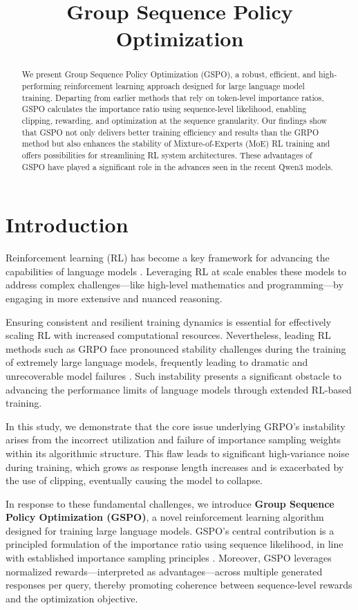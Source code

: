 \title{Group Sequence Policy Optimization}

\begin{abstract}
We present Group Sequence Policy Optimization (GSPO), a robust, efficient, and high-performing reinforcement learning approach designed for large language model training. Departing from earlier methods that rely on token-level importance ratios, GSPO calculates the importance ratio using sequence-level likelihood, enabling clipping, rewarding, and optimization at the sequence granularity. Our findings show that GSPO not only delivers better training efficiency and results than the GRPO method but also enhances the stability of Mixture-of-Experts (MoE) RL training and offers possibilities for streamlining RL system architectures. These advantages of GSPO have played a significant role in the advances seen in the recent Qwen3 models.
\end{abstract}

\section{Introduction}
\label{sec:intro}

Reinforcement learning (RL) has become a key framework for advancing the capabilities of language models \citep{o1,dpsk-r1,qwq32b,qwen3}. Leveraging RL at scale enables these models to address complex challenges—like high-level mathematics and programming—by engaging in more extensive and nuanced reasoning.

Ensuring consistent and resilient training dynamics is essential for effectively scaling RL with increased computational resources. Nevertheless, leading RL methods such as GRPO \citep{grpo} face pronounced stability challenges during the training of extremely large language models, frequently leading to dramatic and unrecoverable model failures \citep{qwen3, minimax-m1}. Such instability presents a significant obstacle to advancing the performance limits of language models through extended RL-based training.

In this study, we demonstrate that the core issue underlying GRPO’s instability arises from the incorrect utilization and failure of importance sampling weights within its algorithmic structure. This flaw leads to significant high-variance noise during training, which grows as response length increases and is exacerbated by the use of clipping, eventually causing the model to collapse.

In response to these fundamental challenges, we introduce \textbf{Group Sequence Policy Optimization (GSPO)}, a novel reinforcement learning algorithm designed for training large language models. GSPO’s central contribution is a principled formulation of the importance ratio using sequence likelihood, in line with established importance sampling principles \citep{click}. Moreover, GSPO leverages normalized rewards—interpreted as advantages—across multiple generated responses per query, thereby promoting coherence between sequence-level rewards and the optimization objective.

